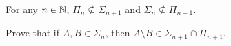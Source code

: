 \begin{corollary}
  For any $n \in {\mathbb{N}}$, $\Pi_n \not\subseteq \Sigma_{n + 1}$ and 
  $\Sigma_n \not\subseteq \Pi_{n + 1}$.
\end{corollary}

\begin{chapterendexercises}
  \exercise Prove that if $A, B \in \Sigma_n$, then 
    $A \setminus B \in \Sigma_{n + 1} \cap \Pi_{n + 1}$.
\end{chapterendexercises}
